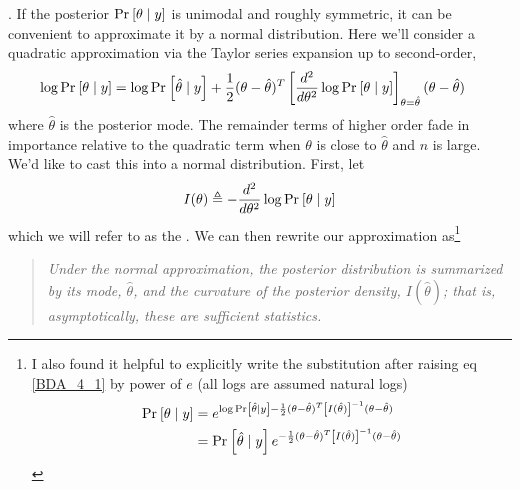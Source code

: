 \documentclass[11pt]{article}
\begin{document}


\p {}. If the posterior $\text{Pr}_{}\left[\theta \mid y\right]$ is unimodal and roughly symmetric, it can be convenient to approximate it by a normal distribution. Here we'll consider a quadratic approximation via the Taylor series expansion up to second-order,
\begin{align}
	\log \text{Pr}_{}\left[\theta \mid y\right]
	&= \log \text{Pr}_{}\left[\hat{\theta} \mid y\right] + 
		\frac{1}{2} (\theta - \hat{\theta})^T \left[ \frac{d^2}{d\theta^2} \log \text{Pr}_{}\left[\theta \mid y\right] \right]_{\theta = \hat{\theta}} (\theta - \hat{\theta}) \label{BDA_4_1}
\end{align}
where $\hat{\theta}$ is the posterior mode. The remainder terms of higher order fade in importance relative to the quadratic term when $\theta$ is close to $\hat{\theta}$ and $n$ is large. We'd like to cast this into a normal distribution. First, let
\begin{align}
	I(\theta) \triangleq - \frac{d^2}{d\theta^2} \log \text{Pr}_{}\left[\theta \mid y\right]
\end{align}
which we will refer to as the . We can then rewrite our approximation as\footnote{I also found it helpful to explicitly write the substitution after raising eq \ref{BDA_4_1} by power of $e$ (all logs are assumed natural logs)
\begin{align}
 \text{Pr}_{}\left[\theta \mid y\right] &= e^{\log\text{Pr}_{}\left[\hat{\theta} \mid y\right]  - \frac{1}{2} (\theta - \hat{\theta})^T \left[I(\hat{\theta}) \right]^{-1} (\theta - \hat{\theta})} \\
 &= \text{Pr}_{}\left[\hat{\theta} \mid y\right] e^{- \frac{1}{2} (\theta - \hat{\theta})^T \left[I(\hat{\theta}) \right]^{-1} (\theta - \hat{\theta})}
\end{align}
}
\begin{quote}
	{\itshape Under the normal approximation, the posterior distribution is summarized by its mode, $\hat{\theta}$, and the curvature of the posterior density, $I(\hat{\theta})$; that is, asymptotically, these are sufficient statistics.}
\end{quote}
\end{document}
